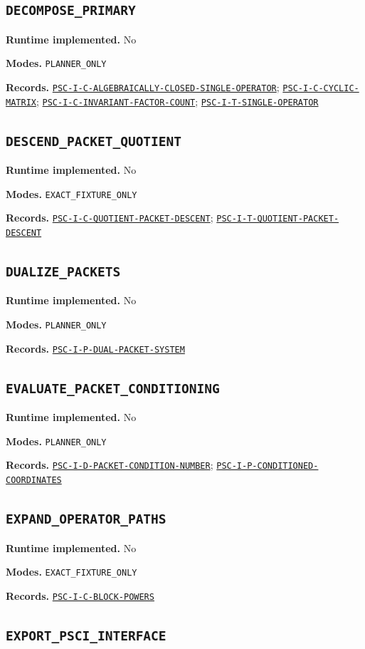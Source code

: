 \documentclass[a4paper,11pt]{article}
\newcommand{\field}[2]{\par\smallskip\noindent\textbf{#1.} #2\par}
\begin{document}
\subsection*{\nolinkurl{DECOMPOSE_PRIMARY}}
\field{Runtime implemented}{No}
\field{Modes}{\nolinkurl{PLANNER_ONLY}}
\field{Records}{\hyperref[rec:PSC-I-C-ALGEBRAICALLY-CLOSED-SINGLE-OPERATOR]{\nolinkurl{PSC-I-C-ALGEBRAICALLY-CLOSED-SINGLE-OPERATOR}}; \hyperref[rec:PSC-I-C-CYCLIC-MATRIX]{\nolinkurl{PSC-I-C-CYCLIC-MATRIX}}; \hyperref[rec:PSC-I-C-INVARIANT-FACTOR-COUNT]{\nolinkurl{PSC-I-C-INVARIANT-FACTOR-COUNT}}; \hyperref[rec:PSC-I-T-SINGLE-OPERATOR]{\nolinkurl{PSC-I-T-SINGLE-OPERATOR}}}
\subsection*{\nolinkurl{DESCEND_PACKET_QUOTIENT}}
\field{Runtime implemented}{No}
\field{Modes}{\nolinkurl{EXACT_FIXTURE_ONLY}}
\field{Records}{\hyperref[rec:PSC-I-C-QUOTIENT-PACKET-DESCENT]{\nolinkurl{PSC-I-C-QUOTIENT-PACKET-DESCENT}}; \hyperref[rec:PSC-I-T-QUOTIENT-PACKET-DESCENT]{\nolinkurl{PSC-I-T-QUOTIENT-PACKET-DESCENT}}}
\subsection*{\nolinkurl{DUALIZE_PACKETS}}
\field{Runtime implemented}{No}
\field{Modes}{\nolinkurl{PLANNER_ONLY}}
\field{Records}{\hyperref[rec:PSC-I-P-DUAL-PACKET-SYSTEM]{\nolinkurl{PSC-I-P-DUAL-PACKET-SYSTEM}}}
\subsection*{\nolinkurl{EVALUATE_PACKET_CONDITIONING}}
\field{Runtime implemented}{No}
\field{Modes}{\nolinkurl{PLANNER_ONLY}}
\field{Records}{\hyperref[rec:PSC-I-D-PACKET-CONDITION-NUMBER]{\nolinkurl{PSC-I-D-PACKET-CONDITION-NUMBER}}; \hyperref[rec:PSC-I-P-CONDITIONED-COORDINATES]{\nolinkurl{PSC-I-P-CONDITIONED-COORDINATES}}}
\subsection*{\nolinkurl{EXPAND_OPERATOR_PATHS}}
\field{Runtime implemented}{No}
\field{Modes}{\nolinkurl{EXACT_FIXTURE_ONLY}}
\field{Records}{\hyperref[rec:PSC-I-C-BLOCK-POWERS]{\nolinkurl{PSC-I-C-BLOCK-POWERS}}}
\subsection*{\nolinkurl{EXPORT_PSCI_INTERFACE}}
\end{document}

